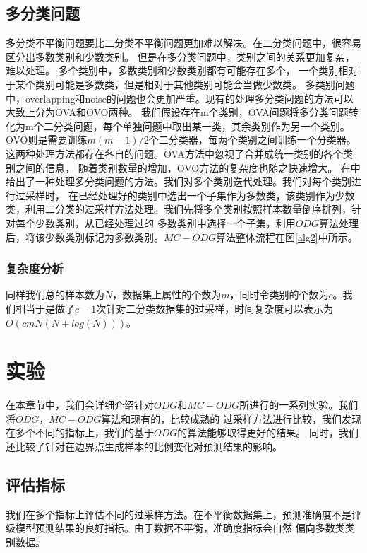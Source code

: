 \documentclass{article}
\begin{document}
\subsection{多分类问题}
多分类不平衡问题要比二分类不平衡问题更加难以解决。在二分类问题中，很容易区分出多数类别和少数类别。
但是在多分类问题中，类别之间的关系更加复杂，难以处理。
多个类别中，多数类别和少数类别都有可能存在多个，
一个类别相对于某个类别可能是多数类，但是相对于其他类别可能会当做少数类。
多类别问题中，overlapping和noise的问题也会更加严重。现有的处理多分类问题的方法可以大致上分为OVA和OVO两种。
我们假设存在m个类别，OVA问题将多分类问题转化为m个二分类问题，每个单独问题中取出某一类，其余类别作为另一个类别。
OVO则是需要训练$m(m-1)/2$个二分类器，每两个类别之间训练一个分类器。这两种处理方法都存在各自的问题。OVA方法中忽视了合并成统一类别的各个类别之间的信息，
随着类别数量的增加，OVO方法的复杂度也随之快速增大。
在\cite{2017CCR,2019Radial}中给出了一种处理多分类问题的方法。我们对多个类别迭代处理。我们对每个类别进行过采样时，
在已经处理好的类别中选出一个子集作为多数类，该类别作为少数类，利用二分类的过采样方法处理。我们先将多个类别按照样本数量倒序排列，针对每个少数类别，从已经处理过的
多数类别中选择一个子集，利用$ODG$算法处理后，将该少数类别标记为多数类别。$MC-ODG$算法整体流程在图\ref{alg2}中所示。

\subsubsection{复杂度分析}
同样我们总的样本数为$N$，数据集上属性的个数为$m$，同时令类别的个数为$c$。我们相当于是做了$c-1$次针对二分类数据集的过采样，时间复杂度可以表示为
$O(cmN(N+log(N)))$。

\section{实验}
在本章节中，我们会详细介绍针对$ODG$和$MC-ODG$所进行的一系列实验。我们将$ODG$，$MC-ODG$算法和现有的，比较成熟的
过采样方法进行比较，我们发现在多个不同的指标上，我们的基于$ODG$的算法能够取得更好的结果。
同时，我们还比较了针对在边界点生成样本的比例变化对预测结果的影响。

\subsection{评估指标}
我们在多个指标上评估不同的过采样方法。在不平衡数据集上，预测准确度不是评级模型预测结果的良好指标。由于数据不平衡，准确度指标会自然
偏向多数类类别数据。
\end{document}
